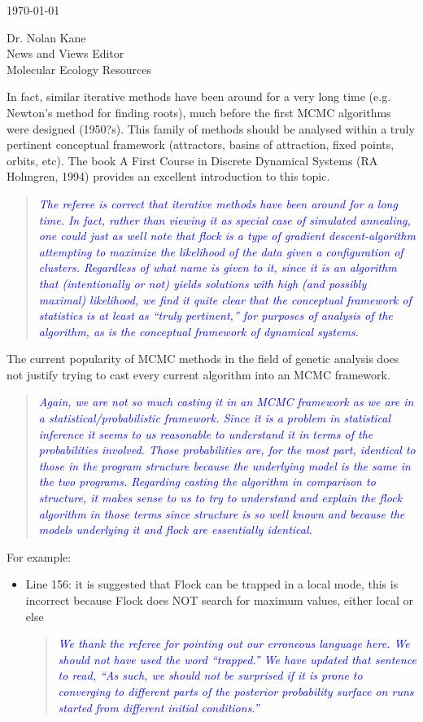\documentclass[11pt]{letter}
\newcommand{\reply}[1]{\begin{quotation}\small\sl\textcolor{blue}{#1}\end{quotation}}
\begin{document}
\begin{letter}{ \today 

Dr. Nolan Kane\\
News and Views Editor\\
Molecular Ecology Resources \\
}
In fact, similar iterative methods have been around for a very long time (e.g. Newton's method for finding roots), much before the first MCMC algorithms were designed (1950?s). This family of methods should be analysed within a truly pertinent conceptual framework (attractors, basins of attraction, fixed points, orbits, etc). The book A First Course in Discrete Dynamical Systems (RA Holmgren, 1994) provides an excellent introduction to this topic. 
\reply{The referee is correct that iterative methods have been around for a long time.
In fact, rather than viewing it as special case of simulated annealing, one could just as well
note that {\sc flock} is a type of gradient descent-algorithm attempting to maximize the
likelihood of the data given a configuration of clusters.
Regardless of what name is given to it, since it is an algorithm
that (intentionally or not) yields solutions with 
high (and possibly maximal) likelihood, we find it quite clear that  
the conceptual framework of statistics is at least as ``truly pertinent,''
for purposes of analysis of the algorithm, as is
the conceptual framework of dynamical systems.
}


The current popularity of MCMC methods in the field of genetic analysis does not justify trying to cast every current algorithm into an MCMC framework.

\reply{Again, we are not so much casting it in an MCMC framework as we are in a 
statistical/probabilistic framework.  Since it is a problem in statistical inference
it seems to us reasonable to understand it in terms of the probabilities involved. Those
probabilities are, for the most part, identical to those in the program {\sc structure} because
the underlying model is the same in the two programs.  Regarding casting the algorithm in
comparison to {\sc structure}, it makes sense to us to try to understand and explain the {\sc flock}
algorithm in those terms since {\sc structure} is so well known and because the models
underlying it and {\sc flock} are essentially identical.  }

For example:
\begin{itemize}
\item Line 156: it is suggested that Flock can be trapped in a local mode, this is incorrect because Flock does NOT search for maximum values, either local or else
\reply{We thank the referee for pointing out our erroneous language here.  We should not have used
the word ``trapped.''  We have updated that sentence to read, ``As such, we should not be surprised
if it is prone 
to converging to different parts of the posterior probability surface on runs started
from different initial conditions.''}


\end{itemize}
\end{letter}
\end{document}
